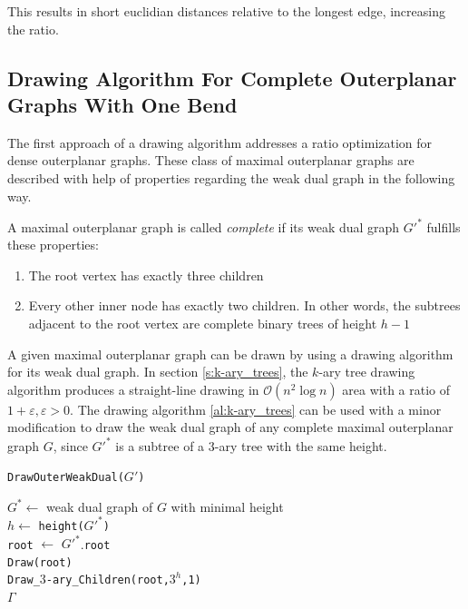 This results in short euclidian distances relative to the longest edge, increasing the ratio.\\

\subsection{Drawing Algorithm For Complete Outerplanar Graphs With One Bend}
The first approach of a drawing algorithm addresses a ratio optimization for dense outerplanar graphs. These class of maximal outerplanar graphs are described with help of properties regarding the weak dual graph in the following way.
\begin{definition}\label{def:complete_maximal_outerplanar}
	A maximal outerplanar graph is called \emph{complete} if its weak dual graph $G'^*$ fulfills these properties:
	\begin{enumerate}
		\item The root vertex has exactly three children
		\item Every other inner node has exactly two children. In other words, the subtrees adjacent to the root vertex are complete binary trees of height $h-1$
	\end{enumerate}
\end{definition}
A given maximal outerplanar graph can be drawn by using a drawing algorithm for its weak dual graph. In section \ref{s:k-ary_trees}, the $k$-ary tree drawing algorithm produces a straight-line drawing in $\mathcal{O}(n^2 \log n)$ area with a ratio of $1+\varepsilon,\varepsilon>0$. The drawing algorithm \ref{al:k-ary_trees} can be used with a minor modification to draw the weak dual graph of any complete maximal outerplanar graph $G$, since $G'^*$ is a subtree of a $3$-ary tree with the same height.\\

\begin{algorithm}[H]
	\caption{\texttt{DrawOuterWeakDual($G'$)}}\label{al:drawouterweakdual}
	$G^* \gets$ weak dual graph of $G$ with minimal height\\
	$h \gets$ \texttt{height($G'^*$)}\\
	\texttt{root} $\gets$ $G'^*$.\texttt{root}\\
	\texttt{Draw(root)}\\
	\texttt{Draw\_$3$-ary\_Children(\texttt{root},$3^h$,1)}\\
	\Return $\Gamma$
\end{algorithm}

